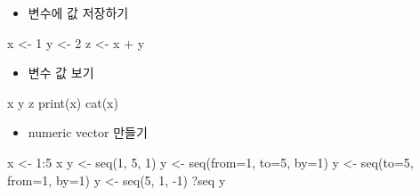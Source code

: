 \documentclass[
]{book}
\newenvironment{Shaded}{\begin{snugshade}}{\end{snugshade}}
\newcommand{\AttributeTok}[1]{\textcolor[rgb]{0.77,0.63,0.00}{#1}}
\newcommand{\DecValTok}[1]{\textcolor[rgb]{0.00,0.00,0.81}{#1}}
\newcommand{\FunctionTok}[1]{\textcolor[rgb]{0.00,0.00,0.00}{#1}}
\newcommand{\NormalTok}[1]{#1}
\newcommand{\OtherTok}[1]{\textcolor[rgb]{0.56,0.35,0.01}{#1}}
\newcommand{\SpecialCharTok}[1]{\textcolor[rgb]{0.00,0.00,0.00}{#1}}
\providecommand{\tightlist}{%
  \setlength{\itemsep}{0pt}\setlength{\parskip}{0pt}}
\begin{document}
\begin{itemize}
\tightlist
\item
  변수에 값 저장하기
\end{itemize}

\begin{Shaded}
\begin{Highlighting}[]
\NormalTok{x }\OtherTok{\textless{}{-}} \DecValTok{1}
\NormalTok{y }\OtherTok{\textless{}{-}} \DecValTok{2}
\NormalTok{z }\OtherTok{\textless{}{-}}\NormalTok{ x }\SpecialCharTok{+}\NormalTok{ y}
\end{Highlighting}
\end{Shaded}

\begin{itemize}
\tightlist
\item
  변수 값 보기
\end{itemize}

\begin{Shaded}
\begin{Highlighting}[]
\NormalTok{x}
\NormalTok{y}
\NormalTok{z}
\FunctionTok{print}\NormalTok{(x)}
\FunctionTok{cat}\NormalTok{(x)}
\end{Highlighting}
\end{Shaded}

\begin{itemize}
\tightlist
\item
  numeric vector 만들기
\end{itemize}

\begin{Shaded}
\begin{Highlighting}[]
\NormalTok{x }\OtherTok{\textless{}{-}} \DecValTok{1}\SpecialCharTok{:}\DecValTok{5}
\NormalTok{x}
\NormalTok{y }\OtherTok{\textless{}{-}} \FunctionTok{seq}\NormalTok{(}\DecValTok{1}\NormalTok{, }\DecValTok{5}\NormalTok{, }\DecValTok{1}\NormalTok{)}
\NormalTok{y }\OtherTok{\textless{}{-}} \FunctionTok{seq}\NormalTok{(}\AttributeTok{from=}\DecValTok{1}\NormalTok{, }\AttributeTok{to=}\DecValTok{5}\NormalTok{, }\AttributeTok{by=}\DecValTok{1}\NormalTok{)}
\NormalTok{y }\OtherTok{\textless{}{-}} \FunctionTok{seq}\NormalTok{(}\AttributeTok{to=}\DecValTok{5}\NormalTok{, }\AttributeTok{from=}\DecValTok{1}\NormalTok{, }\AttributeTok{by=}\DecValTok{1}\NormalTok{)}
\NormalTok{y }\OtherTok{\textless{}{-}} \FunctionTok{seq}\NormalTok{(}\DecValTok{5}\NormalTok{, }\DecValTok{1}\NormalTok{, }\SpecialCharTok{{-}}\DecValTok{1}\NormalTok{)}
\NormalTok{?seq}
\NormalTok{y}
\end{Highlighting}
\end{Shaded}
\end{document}
